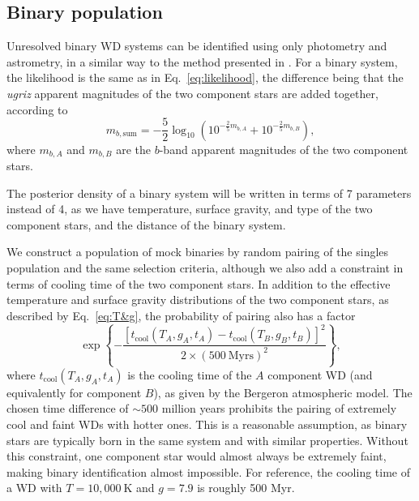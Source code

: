 \documentclass[fleqn,usenatbib]{mnras}
\newcommand{\Teff}{T}
\newcommand{\logg}{g}
\newcommand{\K}{\text{K}}
\begin{document}
\subsection{Binary population}

Unresolved binary WD systems can be identified using only photometry and astrometry, in a similar way to the method presented in \cite{2018ApJ...857..114W}. For a binary system, the likelihood is the same as in Eq.~\eqref{eq:likelihood}, the difference being that the \emph{ugriz} apparent magnitudes of the two component stars are added together, according to
\begin{equation}
	m_{b,\text{sum}} = - \frac{5}{2}\log_{10}\left( 10^{-\frac{2}{5}m_{b,A}}+10^{-\frac{2}{5}m_{b,B}}  \right),
\end{equation}
where $m_{b,A}$ and $m_{b,B}$ are the $b$-band apparent magnitudes of the two component stars.

The posterior density of a binary system will be written in terms of 7 parameters instead of 4, as we have temperature, surface gravity, and type of the two component stars, and the distance of the binary system.

We construct a population of mock binaries by random pairing of the singles population and the same selection criteria, although we also add a constraint in terms of cooling time of the two component stars. In addition to the effective temperature and surface gravity distributions of the two component stars, as described by Eq.~\eqref{eq:T&g}, the probability of pairing also has a factor
\begin{equation}\label{eq:time_difference}
	\exp\left\{
	-\frac{[t_\text{cool}(\Teff_A,\logg_A,t_A)-t_\text{cool}(\Teff_B,\logg_B,t_B)]^2}{2\times ( 500~\text{Myrs})^2}
	\right\},
\end{equation}
where $t_\text{cool}(\Teff_A,\logg_A,t_A)$ is the cooling time of the $A$ component WD (and equivalently for component $B$), as given by the Bergeron atmospheric model. The chosen time difference of $\sim 500$ million years prohibits the pairing of extremely cool and faint WDs with hotter ones. This is a reasonable assumption, as binary stars are typically born in the same system and with similar properties. Without this constraint, one component star would almost always be extremely faint, making binary identification almost impossible. For reference, the cooling time of a WD with $\Teff=10,000~\K$ and $\logg=7.9$ is roughly 500 Myr.
\end{document}
